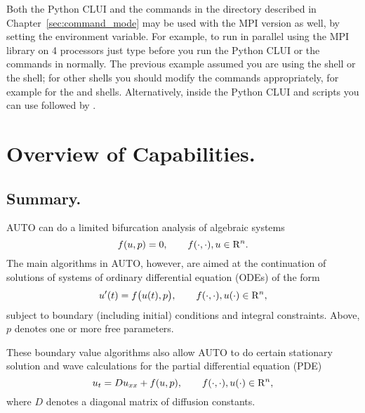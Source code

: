 \documentclass[12pt]{report}
\def\Rn{{\rm R}^n}
\begin{document}
Both the Python CLUI and the commands in the 
directory described in Chapter~\ref{sec:command_mode} may be used with the
MPI version as well, by setting the 
environment variable.  For example, to run \AUTO in parallel using
the MPI library on 4 processors just type
before you run the Python CLUI  or
the commands in  normally. 
The previous example
assumed you are using the  shell or the  shell; for
other shells you should modify the commands appropriately,
for example 
for the  and  shells. Alternatively,
inside the Python
CLUI and scripts you can use  followed by
.

\chapter{ Overview of Capabilities.} \label{ch:Overview}
\section{ Summary.} \label{sec:Summary}
{\cal AUTO} can do a limited bifurcation analysis of algebraic systems
\begin{equation} \label{1} 
  f( u , p ) = 0 ,  \qquad  f(\cdot,\cdot) , u \in \Rn.
\end{equation}
The main algorithms in {\cal AUTO}, however, are aimed at the continuation
of solutions of systems of ordinary differential equation (ODEs) of the form
\begin{equation} \label{2} 
 u'(t) = f\bigl( u(t) , p \bigr) , 
  \qquad  f(\cdot,\cdot) , u(\cdot) \in \Rn,
\end{equation}
subject to boundary (including initial) conditions and integral constraints.
Above, $p$ denotes one or more free parameters.

These boundary value algorithms also allow {\cal AUTO} to do certain stationary 
solution and wave calculations for the partial differential equation (PDE)
\begin{equation} \label{3} 
  u_t = D u_{xx} + f( u , p ), 
  \qquad  f(\cdot,\cdot) , u(\cdot) \in \Rn,
\end{equation}
where $D$ denotes a diagonal matrix of diffusion constants.
\end{document}
